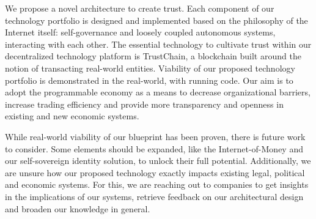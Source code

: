\documentclass[USenglish]{article}
\begin{document}
We propose a novel architecture to create trust.
Each component of our technology portfolio is designed and implemented based on the philosophy of the Internet itself: self-governance and loosely coupled autonomous systems, interacting with each other.
The essential technology to cultivate trust within our decentralized technology platform is TrustChain, a blockchain built around the notion of transacting real-world entities.
Viability of our proposed technology portfolio is demonstrated in the real-world, with running code.
Our aim is to adopt the programmable economy as a means to decrease organizational barriers, increase trading efficiency and provide more transparency and openness in existing and new economic systems.

While real-world viability of our blueprint has been proven, there is future work to consider.
Some elements should be expanded, like the Internet-of-Money and our self-sovereign identity solution, to unlock their full potential.
Additionally, we are unsure how our proposed technology exactly impacts existing legal, political and economic systems.
For this, we are reaching out to companies to get insights in the implications of our systems, retrieve feedback on our architectural design and broaden our knowledge in general.


%

\end{document}
